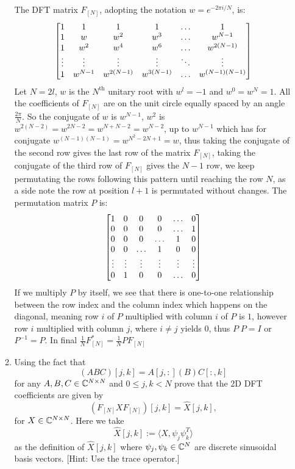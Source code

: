 \documentclass[12pt,twoside]{article}
\begin{document}
\begin{enumerate}
\begin{enumerate}
    The DFT matrix $F_{[N]}$, adopting the notation $w = e^{-2\pi i /N}$, is:
    $$
    \begin{bmatrix} 
    1 & 1 & 1 & 1 & \ldots & 1 \\
    1 & w & w^2 & w^3 & \ldots & w^{N-1} \\
    1 & w^2 & w^4 & w^6 & \ldots & w^{2 (N-1)} \\
    \vdots & \vdots & \vdots & \vdots & \ddots & \vdots \\
    1 & w^{N-1}	& w^{2(N-1)} & w^{3 (N-1)} & \ldots & w^{(N-1) (N-1)}	\\
     \end{bmatrix}
    $$
   Let $N=2l$,  $w$ is the $N^{\text{th}}$ unitary root with $w^l = -1$ and  $w^0 = w^N = 1$. All the coefficients of $F_{[N]}$ are on the unit circle equally spaced by an angle $\frac{2\pi}{N}$.
   So the conjugate of $w$ is $w^{N-1}$, $w^2$ is $w^{2 (N-2)} = w^{2N-2} = w^{N + N-2} = w^{N-2}$, up to $w^{N-1}$ which has for conjugate $w^{(N-1)(N-1)} = w^{N^2-2N+1} = w$, 
   thus taking the conjugate of the second row  gives the last row of the matrix $F_{[N]}$, 
   taking the conjugate of the third row of $F_{[N]}$ gives the $N-1$ row, 
   we keep permutating the rows following this pattern until reaching the row $N$, as a side note the row at position $l+1$ is permutated without changes.
   The permutation matrix $P$ is:
       $$
    \begin{bmatrix} 
    1 & 0 & 0 & 0 & \ldots & 0 \\
    0 & 0 & 0 & 0 & \ldots & 1 \\
    0 & 0 & 0 & \ldots & 1 & 0 \\
    0 & 0 & \ldots & 1 & 0 & 0 \\
    \vdots & \vdots & \vdots & \vdots & \vdots & \vdots\\
    0 & 1	& 0 & 0 & \ldots & 0	\\
     \end{bmatrix}
    $$
    If we multiply $P$ by itself, we see that  there is one-to-one relationship between the row index and the column index which happens on the diagonal,
    meaning row $i$ of $P$ multiplied with column $i$ of $P$ is $1$, however row $i$  multiplied with column $j$, where $i \neq j$ yields $0$, thus $P \; P = I$ or $P^{-1} = P$.
    In final $\frac{1}{N}F_{[N]}^* = \frac{1}{N}PF_{[N]}$
   
    
  \item Using the fact that
    $$(ABC)[j,k] = A[j,:](B)C[:,k]$$
    for any $A,B,C\in\mathbb{C}^{N\times N}$ and $0\leq j,k<N$ prove that
    the 2D DFT coefficients are given by
    $$(F_{[N]}XF_{[N]})[j,k] = \hat{X}[j,k],$$
    for $X\in\mathbb{C}^{N\times N}$.  Here we take
    $$\hat{X}[j,k] := \langle X,\psi_j\psi_k^T\rangle$$
    as the definition of $\hat{X}[j,k]$
    where $\psi_j,\psi_k\in\mathbb{C}^N$ are discrete
    sinusoidal basis vectors.
    [Hint: Use the trace operator.]\\
    

\end{enumerate}
\end{enumerate}
\end{document}
